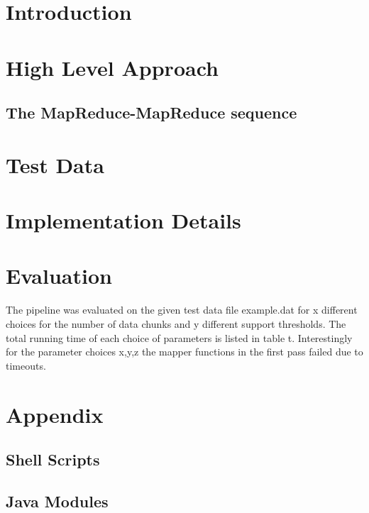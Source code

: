 \documentclass[a4paper,ngerman]{scrartcl}
\begin{document}
\section{Introduction}
\section{High Level Approach}
\subsection{The MapReduce-MapReduce sequence}

\section{Test Data}\label{test data}
\section{Implementation Details}

\section{Evaluation}
The pipeline was evaluated on the given test data file example.dat for x different choices for the number of data chunks and y different support thresholds. The total running time of each choice of parameters is listed in table t. Interestingly for the parameter choices x,y,z the mapper functions in the first pass failed due to timeouts.
\section{Appendix}
\subsection{Shell Scripts}\label{scripts}
\subsection{Java Modules}\label{java}
\end{document}
